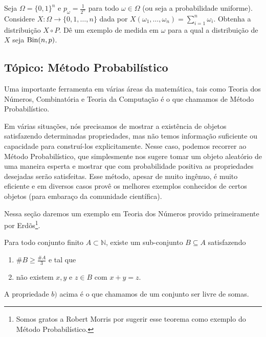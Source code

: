 \begin{exercise}
  Seja $\Omega = \{0,1\}^n$ e $p_\omega = \tfrac 1{2^n}$ para todo $\omega \in \Omega$ (ou seja a probabilidade uniforme).
  Considere $X: \Omega \to \{0,1, \dots, n\}$ dada por $X(\omega_1, \dots, \omega_n) = \sum_{i=1}^n \omega_i$.
  Obtenha a distribuição $X \circ P$.
  Dê um exemplo de medida em $\omega$ para a qual a distribuição de $X$ seja $\operatorname{Bin}(n,p)$.
\end{exercise}

\begin{topics}

\section{Tópico: Método Probabilístico}

Uma importante ferramenta em várias áreas da matemática, tais como Teoria dos Números, Combinatória e Teoria da Computação é o que chamamos de Método Probabilístico. 

Em várias situações, nós precisamos de mostrar a existência de objetos satisfazendo determinadas propriedades, mas não temos informação suficiente ou capacidade para construí-los explicitamente.
Nesse caso, podemos recorrer ao Método Probabilístico, que simplesmente nos sugere tomar um objeto aleatório de uma maneira esperta e mostrar que com probabilidade positiva as propriedades desejadas serão satisfeitas.
Esse método, apesar de muito ingênuo, é muito eficiente e em diversos casos provê os melhores exemplos conhecidos de certos objetos (para embaraço da comunidade científica).

Nessa seção daremos um exemplo em Teoria dos Números provido primeiramente por Erdõs\footnote{Somos gratos a Robert Morris por sugerir esse teorema como exemplo do Método Probabilístico.}.

\begin{theorem}[Erdös]
  Para todo conjunto finito $A \subset \mathbb{N}$, existe um sub-conjunto $B \subseteq A$ satisfazendo
  \begin{enumerate}[\quad a)]
  \item $\# B \geq \frac{\#A}{3}$ e tal que
  \item não existem $x, y$ e $z \in B$ com $x + y = z$.
  \end{enumerate}
  A propriedade $b)$ acima é o que chamamos de um conjunto ser livre de somas. 
\end{theorem}


\end{topics}
